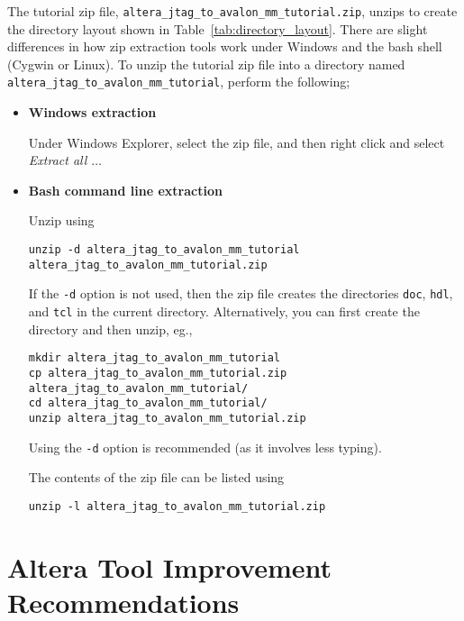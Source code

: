 \documentclass[10pt,twoside]{article}
\begin{document}
The tutorial zip file, 
\verb+altera_jtag_to_avalon_mm_tutorial.zip+, unzips to create
the directory layout shown in Table~\ref{tab:directory_layout}.
There are slight differences in how zip extraction tools work
under Windows and the bash shell (Cygwin or Linux).
To unzip the tutorial zip file into a directory named
\verb+altera_jtag_to_avalon_mm_tutorial+, perform the following;
%
\begin{itemize}
\item {\bf Windows extraction}

   Under Windows Explorer, select the zip file, and then
   right click and select {\em Extract all $\dots$}
  
\item {\bf Bash command line extraction}

Unzip using
%
\begin{verbatim}
unzip -d altera_jtag_to_avalon_mm_tutorial altera_jtag_to_avalon_mm_tutorial.zip
\end{verbatim}
%
If the \verb+-d+ option is not used, then the zip file creates
the directories \verb+doc+, \verb+hdl+, and \verb+tcl+ in the
current directory. Alternatively, you can first create
the directory and then unzip, eg.,
%
\begin{verbatim}
mkdir altera_jtag_to_avalon_mm_tutorial
cp altera_jtag_to_avalon_mm_tutorial.zip altera_jtag_to_avalon_mm_tutorial/
cd altera_jtag_to_avalon_mm_tutorial/
unzip altera_jtag_to_avalon_mm_tutorial.zip
\end{verbatim}
%
Using the \verb+-d+ option is recommended (as it involves less typing).
 
The contents of the zip file can be listed using
%
\begin{verbatim}
unzip -l altera_jtag_to_avalon_mm_tutorial.zip
\end{verbatim}
%
\end{itemize}

\clearpage
\section{Altera Tool Improvement Recommendations}
\label{app:altera_bugs}
\end{document}
